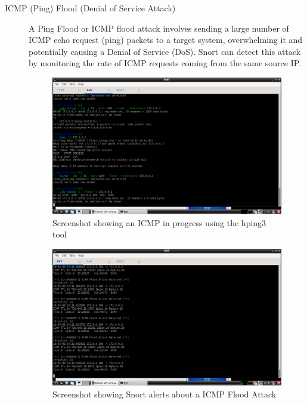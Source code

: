 \documentclass[12pt,a4paper]{report}
\begin{document}
\begin{description}
   
	\item[ICMP (Ping) Flood (Denial of Service Attack)] A Ping Flood or ICMP flood attack involves sending a large number of ICMP echo request (ping) packets to a target system, overwhelming it and potentially causing a Denial of Service (DoS). Snort can detect this attack by monitoring the rate of ICMP requests coming from the same source IP.
	
\begin{figure}[H]
    \centering
    \includegraphics[width=\textwidth]{flood attk.png} 
    \caption{Screenshot showing an ICMP in progress using the hping3 tool}
    \label{fig:mesh1}
\end{figure}

\begin{figure}[H]
    \centering
    \includegraphics[width=\textwidth]{flood logs.png} 
    \caption{Screenshot showing Snort alerts about a ICMP Flood Attack}
    \label{fig:mesh1}
\end{figure}
	
	
      

\end{description}
\end{document}
